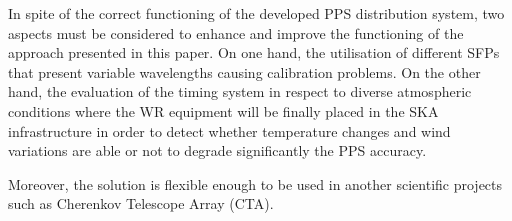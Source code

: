 In spite of the correct functioning of the developed PPS distribution system, 
two aspects must be considered to enhance and improve the functioning of the approach presented in this paper. 
On one hand, the utilisation of different SFPs that present variable wavelengths causing calibration problems.
On the other hand, the evaluation of the timing system in respect to diverse atmospheric
conditions where the WR equipment will be finally placed in the SKA infrastructure in order to detect whether
temperature changes and wind variations are able or not to degrade significantly the PPS accuracy.

Moreover, the solution is flexible enough to be used in another scientific projects such as Cherenkov Telescope Array (CTA). 
